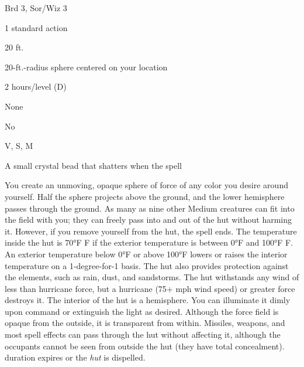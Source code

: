 
\begin{description*}
\item[Level:] Brd 3, Sor/Wiz 3
\item[Casting Time:] 1 standard action
\item[Range:] 20 ft.
\item[Effect:] 20-ft.-radius sphere centered on your location
\item[Duration:] 2 hours/level (D)
\item[Saving Throw:] None
\item[Spell Resistance:] No
\item[Components:] V, S, M
\item[Arcane Material Component:] A small crystal bead that shatters when the spell
\end{description*}

You create an unmoving, opaque sphere of force of any color you desire around yourself.
Half the sphere projects above the ground, and the lower hemisphere passes through
the ground. As many as nine other Medium creatures can fit into the field with
you; they can freely pass into and out of the hut without harming it. However,
if you remove yourself from the hut, the spell ends.
The temperature inside the hut is 70°F F if the exterior temperature is between
0°F and 100°F F. An exterior temperature below 0°F or above 100°F lowers or raises
the interior temperature on a 1-degree-for-1 basis. The hut also provides protection
against the elements, such as rain, dust, and sandstorms. The hut withstands any
wind of less than hurricane force, but a hurricane (75+ mph wind speed) or greater
force destroys it.
The interior of the hut is a hemisphere. You can illuminate it dimly upon command
or extinguish the light as desired. Although the force field is opaque from the
outside, it is transparent from within. Missiles, weapons, and most spell effects
can pass through the hut without affecting it, although the occupants cannot be
seen from outside the hut (they have total concealment).
duration expires or the \textit{hut} is dispelled.